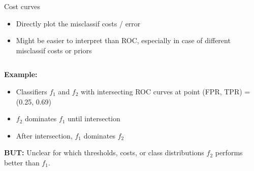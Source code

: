 \begin{vbframe}{Cost curves}

\begin{itemize}
  \item Directly plot the misclassif costs / error 
  \item Might be easier to interpret than ROC, especially in case of 
      different misclassif costs or priors
\end{itemize}

\lz


\begin{columns}%
\begin{column}{0.6\textwidth}
  \small
  \raggedright
  \textbf{Example:} %
  \begin{itemize}
  \item Classifiers $f_1$ and $f_2$ with intersecting ROC curves at point (FPR, TPR) = (0.25, 0.69)
  \item $f_2$ dominates $f_1$ until intersection
  \item After intersection, $f_1$ dominates $f_2$
  \end{itemize}

  \textbf{BUT:} Unclear for which thresholds, costs, or class distributions $f_2$ performs better than $f_1$.


\end{column}
\end{columns}
\end{vbframe}
